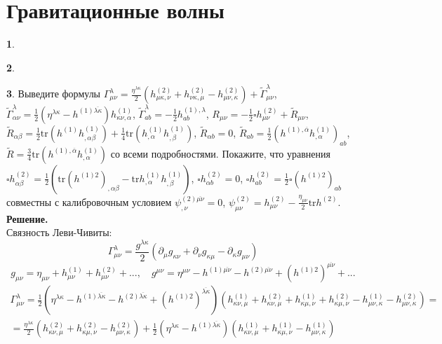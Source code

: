 \documentclass[12pt]{article}
\theoremstyle{definition}
\newtheorem{zad}{}[section]
\begin{document}
\section{Гравитационные волны}
\begin{zad}

\end{zad}
\begin{zad}

\end{zad}
\begin{zad}
Выведите формулы $\Gamma_{\mu\nu}^\lambda=\frac{\eta^{\lambda\kappa}}{2}(h^{(2)}_{\mu\kappa,\nu}+h^{(2)}_{\nu\kappa,\mu}-h^{(2)}_{\mu\nu,\kappa})+\tilde\Gamma^\lambda_{\mu\nu}$, $\tilde\Gamma_{\alpha\nu}^\lambda=\frac{1}{2}(\eta^{\lambda\kappa}-h^{(1)\overline{\lambda\kappa}})h^{(1)}_{\kappa\nu,\alpha}$, $\tilde{\Gamma}^\lambda_{ab}=-\frac{1}{2}h^{(1),\lambda}_{ab}$, $R_{\mu\nu}=-\frac{1}{2}\square h_{\mu\nu}^{(2)}+\tilde R_{\mu\nu}$, $\tilde R_{\alpha\beta}=\frac{1}{2}\text{tr}(h^{(1)}h^{(1)}_{,\alpha\beta})+\frac{1}{4}\text{tr}(h^{(1)}_{,\alpha}h^{(1)}_{,\beta})$, $\tilde R_{\alpha b}=0$, $\tilde R_{ab}=\frac{1}{2}(h^{(1),\overline{\alpha}}h^{(1)}_{,\alpha})_{ab}$, $\tilde R=\frac{3}{4}\text{tr}(h^{(1),\overline{\alpha}}h^{(1)}_{,\alpha})$ со всеми подробностями. Покажите, что уравнения $\square h^{(2)}_{\alpha\beta}=\frac{1}{2}\left(\text{tr}(h^{(1)2})_{,\alpha\beta}-\text{tr}h^{(1)}_{,\alpha}h^{(1)}_{,\beta}\right)$, $\square h^{(2)}_{\alpha b}=0$, $\square h^{(2)}_{ab}=\frac{1}{2}\square(h^{(1)2})_{ab}$ совместны с калибровочным условием $\psi^{(2)\overline{\mu\nu}}_{,\nu}=0$, $\psi^{(2)}_{\mu\nu}=h^{(2)}_{\mu\nu}-\frac{\eta_{\mu\nu}}{2}\text{tr}h^{(2)}$.\\
\textbf{Решение.}\\
Связность Леви-Чивиты:
\begin{equation}
    \Gamma^\lambda_{\mu\nu}=\frac{g^{\lambda\kappa}}{2}(\partial_\mu g_{\kappa\nu}+\partial_\nu g_{\kappa\mu}-\partial_\kappa g_{\mu\nu})
\end{equation}
\begin{equation}
    g_{\mu\nu}=\eta_{\mu\nu}+h^{(1)}_{\mu\nu}+h^{(2)}_{\mu\nu}+...,\quad g^{\mu\nu}=\eta^{\mu\nu}-h^{(1)\overline{\mu\nu}}-h^{(2)\overline{\mu\nu}}+(h^{(1)2})^{\overline{\mu\nu}}+...
\end{equation}
\begin{multline}
    \Gamma^\lambda_{\mu\nu}=\frac{1}{2}(\eta^{\lambda\kappa}-h^{(1)\overline{\lambda\kappa}}-h^{(2)\overline{\lambda\kappa}}+(h^{(1)2})^{\overline{\lambda\kappa}})(h^{(1)}_{\kappa\nu,\mu}+h^{(2)}_{\kappa\nu,\mu}+h^{(1)}_{\kappa\mu,\nu}+h^{(2)}_{\kappa\mu,\nu}-h^{(1)}_{\mu\nu,\kappa}-h^{(2)}_{\mu\nu,\kappa})=\\=\frac{\eta^{\lambda\kappa}}{2}(h^{(2)}_{\kappa\nu,\mu}+h^{(2)}_{\kappa\mu,\nu}-h^{(2)}_{\mu\nu,\kappa})+\frac{1}{2}(\eta^{\lambda\kappa}-h^{(1)\overline{\lambda\kappa}})(h^{(1)}_{\kappa\nu,\mu}+h^{(1)}_{\kappa\mu,\nu}-h^{(1)}_{\mu\nu,\kappa})

\end{multline}
\end{zad}
\end{document}
